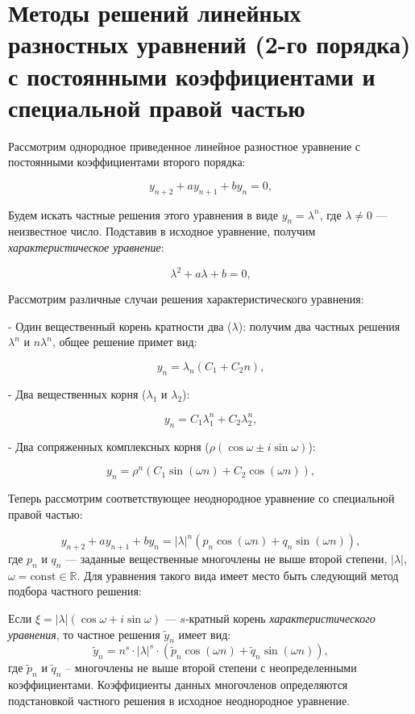\documentclass[__main__.tex]{subfiles}
\begin{document}
\section{Методы решений линейных разностных уравнений (2-го порядка) с постоянными коэффициентами и специальной правой частью}

Рассмотрим однородное приведенное линейное разностное уравнение с постоянными коэффициентами второго порядка:

$$
    y_{n+2} + a y_{n+1} + b y_{n} = 0, 
$$

Будем искать частные решения этого уравнения в виде $y_{n}=\lambda^{n}$, где $\lambda\neq 0$ --- неизвестное число. Подставив в исходное уравнение, получим \textit{характеристическое уравнение}:

$$
    \lambda^{2} + a \lambda + b = 0,
$$

Рассмотрим различные случаи решения характеристического уравнения:

- Один вещественный корень кратности два ($\lambda$): получим два частных решения $\lambda^{n}$ и $n\lambda^{n}$, общее решение примет вид:

$$
    y_{n} = \lambda_{n}\left(C_{1} + C_{2}n\right),
$$

- Два вещественных корня ($\lambda_{1}$ и $\lambda_{2}$):

$$
    y_{n} = C_{1}\lambda^{n}_{1} + C_{2}\lambda^{n}_{2},
$$

- Два сопряженных комплексных корня ($\rho\left(\cos\omega \pm i\sin\omega\right)$):

$$
    y_{n} = \rho^{n}\left(C_{1}\sin\left(\omega n\right) + C_{2}\cos\left(\omega n\right)\right),
$$


Теперь рассмотрим соответствующее неоднородное уравнение со специальной правой частью:

$$
    y_{n+2} + a y_{n+1} + b y_{n}
    =
    \left|\lambda\right|^{n}\left(
          p_{n}\cos\left( \omega n \right)
        + q_{n}\sin\left( \omega n \right)
    \right),
$$
где $p_{n}$ и $q_{n}$ --- заданные вещественные многочлены не выше второй степени, $\left|\lambda\right|$, $\omega=\mathrm{const}\in\mathbb{R}$. Для уравнения такого вида имеет место быть следующий метод подбора частного решения:

Если $\xi=\left|\lambda\right|\left( \cos\omega+i\sin\omega \right)$ --- $s$-кратный корень \textit{характеристического уравнения}, то частное решения $\tilde{y}_{n}$ имеет вид:
$$
    \tilde{y}_{n} = n^{s}\cdot\left|\lambda\right|^{s}\cdot
    \left(
          \tilde{p}_{n}\cos\left( \omega n \right)
        + \tilde{q}_{n}\sin\left( \omega n \right)
    \right),
$$
где $\tilde{p}_{n}$ и $\tilde{q}_{n}$ -- многочлены не выше второй степени с неопределенными коэффициентами. Коэффициенты данных многочленов определяются подстановкой частного решения в исходное неоднородное уравнение.
\end{document}
